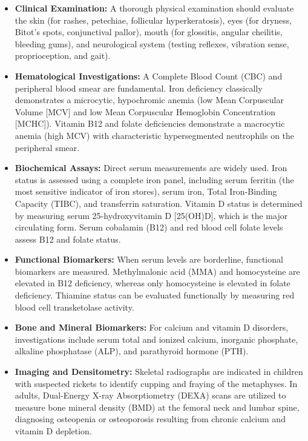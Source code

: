\begin{itemize}
    \item \textbf{Clinical Examination:} A thorough physical examination should evaluate the skin (for rashes, petechiae, follicular hyperkeratosis), eyes (for dryness, Bitot's spots, conjunctival pallor), mouth (for glossitis, angular cheilitis, bleeding gums), and neurological system (testing reflexes, vibration sense, proprioception, and gait).
    \item \textbf{Hematological Investigations:} A Complete Blood Count (CBC) and peripheral blood smear are fundamental. Iron deficiency classically demonstrates a microcytic, hypochromic anemia (low Mean Corpuscular Volume [MCV] and low Mean Corpuscular Hemoglobin Concentration [MCHC]). Vitamin B12 and folate deficiencies demonstrate a macrocytic anemia (high MCV) with characteristic hypersegmented neutrophils on the peripheral smear.
    \item \textbf{Biochemical Assays:} Direct serum measurements are widely used. Iron status is assessed using a complete iron panel, including serum ferritin (the most sensitive indicator of iron stores), serum iron, Total Iron-Binding Capacity (TIBC), and transferrin saturation. Vitamin D status is determined by measuring serum 25-hydroxyvitamin D [25(OH)D], which is the major circulating form. Serum cobalamin (B12) and red blood cell folate levels assess B12 and folate status.
    \item \textbf{Functional Biomarkers:} When serum levels are borderline, functional biomarkers are measured. Methylmalonic acid (MMA) and homocysteine are elevated in B12 deficiency, whereas only homocysteine is elevated in folate deficiency. Thiamine status can be evaluated functionally by measuring red blood cell transketolase activity.
    \item \textbf{Bone and Mineral Biomarkers:} For calcium and vitamin D disorders, investigations include serum total and ionized calcium, inorganic phosphate, alkaline phosphatase (ALP), and parathyroid hormone (PTH).
    \item \textbf{Imaging and Densitometry:} Skeletal radiographs are indicated in children with suspected rickets to identify cupping and fraying of the metaphyses. In adults, Dual-Energy X-ray Absorptiometry (DEXA) scans are utilized to measure bone mineral density (BMD) at the femoral neck and lumbar spine, diagnosing osteopenia or osteoporosis resulting from chronic calcium and vitamin D depletion.
\end{itemize}

